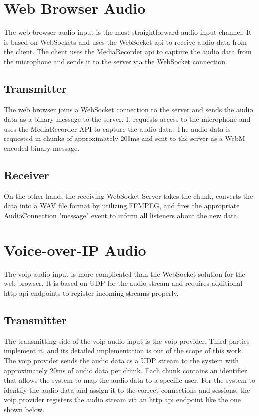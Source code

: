 \section{Web Browser Audio}

The web browser audio input is the most straightforward audio input channel. It is based on WebSockets and
uses the WebSocket \ac{api} to receive audio data from the client. The client uses the MediaRecorder \ac{api} to 
capture the audio data from the microphone and sends it to the server via the WebSocket connection.

\subsection{Transmitter}

The web browser joins a WebSocket connection to the server and sends the audio data as a binary message to the server. 
It requests access to the microphone and uses the MediaRecorder API to capture the audio data. 
The audio data is requested in chunks of approximately 200ms and sent to the server as a WebM-encoded binary message.

\subsection{Receiver}

On the other hand, the receiving WebSocket Server takes the chunk, converts the data into a WAV file format by 
utilizing FFMPEG, and fires the appropriate AudioConnection "message" event to inform all listeners about the new data.


\section{Voice-over-IP Audio}

The \ac{voip} audio input is more complicated than the WebSocket solution for the web browser. It is based on UDP 
for the audio stream and requires additional \ac{http} \ac{api} endpoints to register incoming streams properly.

\subsection{Transmitter}

The transmitting side of the \ac{voip} audio input is the \ac{voip} provider. Third parties implement it, and its 
detailed implementation is out of the scope of this work. The \ac{voip} provider sends the audio data as a UDP stream 
to the system with approximately 20ms of audio data per chunk. Each chunk contains an identifier that allows the system 
to map the audio data to a specific user. For the system to identify the audio data and assign it to the correct 
connections and sessions, the \ac{voip} provider registers the audio stream via an \ac{http} \ac{api} endpoint like the 
one shown below.

